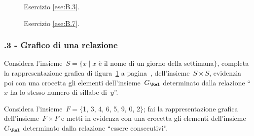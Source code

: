 \begin{figure}[t]
\begin{minipage}[b]{.45\textwidth}
 \centering
 
 \caption{Esercizio \ref{ese:B.3}.}\label{fig:B.11}
\end{minipage}\hfil
\begin{minipage}[b]{.45\textwidth}
 \centering
 
 \caption{Esercizio \ref{ese:B.7}.}\label{fig:B.12}
\end{minipage}
\end{figure}
\begin{multicols}{2}
\subsubsection*{\thechapter.3 - Grafico di una relazione}
 \begin{esercizio}
\label{ese:B.7}
Considera l'insieme~$S = \{ x \mid  x$ è il nome di un giorno della settimana$\}$, completa la rappresentazione grafica di figura~\ref{fig:B.12} a pagina~\pageref{fig:B.12}, dell'insieme~$S \times S$,
evidenzia poi con una crocetta gli elementi dell'insieme~$G_\Rel$ determinato dalla relazione ``$x$ ha lo stesso numero di sillabe di~$y$''.
\end{esercizio}

\begin{esercizio}
\label{ese:B.8}
Considera l'insieme~$F = \{$1, 3, 4, 6, 5, 9, 0, 2$\}$; fai la rappresentazione grafica dell'insieme~$F \times F$ e metti in evidenza con una crocetta gli
elementi dell'insieme~$G_\Rel$ determinato dalla relazione ``essere consecutivi''.
\end{esercizio}
\end{multicols}

